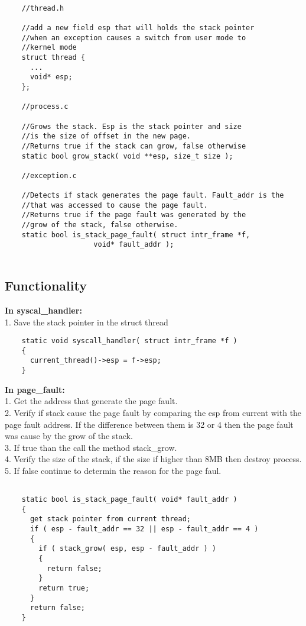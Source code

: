 \begin{lstlisting} 

	//thread.h

	//add a new field esp that will holds the stack pointer
	//when an exception causes a switch from user mode to
	//kernel mode
	struct thread {
	  ...
	  void* esp;
	};

	//process.c

	//Grows the stack. Esp is the stack pointer and size
	//is the size of offset in the new page.
	//Returns true if the stack can grow, false otherwise
	static bool grow_stack( void **esp, size_t size );

	//exception.c

	//Detects if stack generates the page fault. Fault_addr is the 
	//that was accessed to cause the page fault.
	//Returns true if the page fault was generated by the
	//grow of the stack, false otherwise.
	static bool is_stack_page_fault( struct intr_frame *f, 
					 void* fault_addr ); 
	
\end{lstlisting}


\subsection{Functionality}
 
\textbf{In syscal\_handler:}
	  \\1. Save the stack pointer in the struct thread

\begin{lstlisting}
	static void syscall_handler( struct intr_frame *f )
	{
	  current_thread()->esp = f->esp;
	}
\end{lstlisting}


\textbf{In page\_fault:}
	  \\1. Get the address that generate the page fault.
	  \\2. Verify if stack cause the page fault by comparing the esp from current with the page fault address. If the difference between them is 32 or 4 then the page fault was cause by the grow of the stack.
	  \\3. If true than the call the method stack\_grow.
	  \\4. Verify the size of the stack, if the size if higher than 8MB then destroy process.
	  \\5. If false continue to determin the reason for the page faul.

\begin{lstlisting}

	static bool is_stack_page_fault( void* fault_addr )
	{
	  get stack pointer from current thread;
	  if ( esp - fault_addr == 32 || esp - fault_addr == 4 )
	  {
	    if ( stack_grow( esp, esp - fault_addr ) )
	    {
	      return false;
	    }
	    return true;
	  }
	  return false;
	}

\end{lstlisting}


